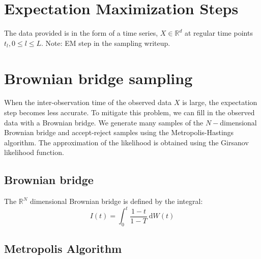 \documentclass{article}
\begin{document}
\section{Expectation Maximization Steps}
The data provided is in the form of a time series, $X \in \mathbb{R}^d$ at regular time points $t_l, 0 \leq l \leq L$. 
Note: EM step in the sampling writeup.

\section{Brownian bridge sampling}
When the inter-observation time of the observed data $X$ is large, the expectation step becomes less accurate. To mitigate this problem, we can fill in the observed data with a Brownian bridge. We generate many samples of the $N-$dimensional Brownian bridge and accept-reject samples using the Metropolis-Hastings algorithm. The approximation of the likelihood is obtained using the Girsanov likelihood function.

\subsection{Brownian bridge}
The $\mathbb{R}^N$ dimensional Brownian bridge is defined by the integral:
\begin{equation}
I(t) = \int_{0}^{t} \dfrac{1 - t}{1 -T} \: \mathrm{d} W(t)
\end{equation}
\subsection{Metropolis Algorithm}
\end{document}

